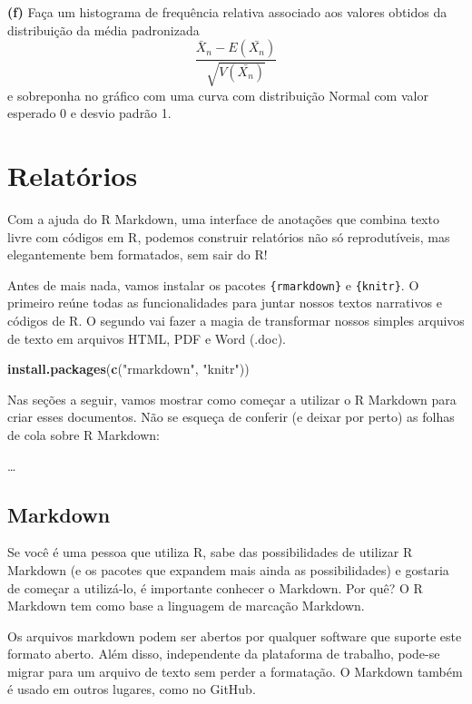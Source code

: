 \documentclass[
]{book}
\newenvironment{Shaded}{\begin{snugshade}}{\end{snugshade}}
\newcommand{\FunctionTok}[1]{\textcolor[rgb]{0.13,0.29,0.53}{\textbf{#1}}}
\newcommand{\NormalTok}[1]{#1}
\newcommand{\StringTok}[1]{\textcolor[rgb]{0.31,0.60,0.02}{#1}}
\begin{document}
\textbf{(f)} Faça um histograma de frequência relativa associado aos valores
obtidos da distribuição da média padronizada
\[\frac{\bar{X}_{n}-E(\bar{X_{n}})}{\sqrt{V(\bar{X_{n}})}}\] e
sobreponha no gráfico com uma curva com distribuição Normal com valor
esperado 0 e desvio padrão 1.

\chapter{Relatórios}\label{relatuxf3rios}

Com a ajuda do R Markdown, uma interface de anotações que combina texto livre com códigos em R, podemos construir relatórios não só reprodutíveis, mas elegantemente bem formatados, sem sair do R!

Antes de mais nada, vamos instalar os pacotes \texttt{\{rmarkdown\}} e \texttt{\{knitr\}}. O primeiro reúne todas as funcionalidades para juntar nossos textos narrativos e códigos de R. O segundo vai fazer a magia de transformar nossos simples arquivos de texto em arquivos HTML, PDF e Word (.doc).

\begin{Shaded}
\begin{Highlighting}[]
\FunctionTok{install.packages}\NormalTok{(}\FunctionTok{c}\NormalTok{(}\StringTok{"rmarkdown"}\NormalTok{, }\StringTok{"knitr"}\NormalTok{))}
\end{Highlighting}
\end{Shaded}

Nas seções a seguir, vamos mostrar como começar a utilizar o R Markdown para criar esses documentos. Não se esqueça de conferir (e deixar por perto) as folhas de cola sobre R Markdown:

\ldots{}

\section{Markdown}\label{markdown}

Se você é uma pessoa que utiliza R, sabe das possibilidades de utilizar R Markdown (e os pacotes que expandem mais ainda as possibilidades) e gostaria de começar a utilizá-lo, é importante conhecer o Markdown. Por quê? O R Markdown tem como base a linguagem de marcação Markdown.

Os arquivos markdown podem ser abertos por qualquer software que suporte este formato aberto. Além disso, independente da plataforma de trabalho, pode-se migrar para um arquivo de texto sem perder a formatação. O Markdown também é usado em outros lugares, como no GitHub.
\end{document}
